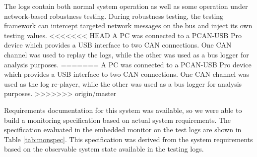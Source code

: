 The logs contain both normal system operation as well as some operation under network-based robustness testing. During robustness testing, the testing framework can intercept targeted network messages on the bus and inject its own testing values. %
<<<<<<< HEAD
A PC was connected to a PCAN-USB Pro \cite{PCAN-USBPro} device which provides a USB interface to two CAN connections. One CAN channel was used to replay the logs, while the other was used as a bus logger for analysis purposes.
=======
A PC was connected to a PCAN-USB Pro \cite{PCAN-USBPro} device which provides a USB interface to two CAN connections. One CAN channel was used as the log re-player, while the other was used as a bus logger for analysis purposes.
>>>>>>> origin/master

Requirements documentation for this system was available, so we were able to build a monitoring specification based on actual system requirements.
The specification evaluated in the embedded monitor on the test logs are shown in Table \ref{tab:monspec}. This specification was derived from the system requirements based on the observable system state available in the testing logs. 



